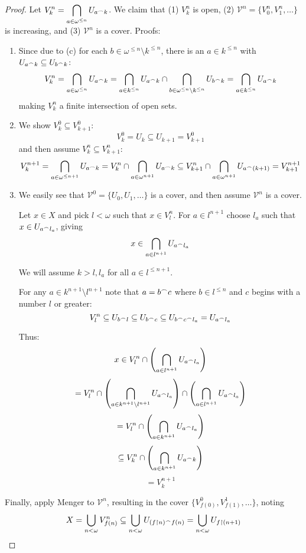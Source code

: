 \begin{proof}
    Let $\displaystyle V_k^n = \bigcap_{a\in\omega^{\leq n}} U_{a^\frown k}$. We claim that (1) $V_k^n$ is open, (2) $\mathcal{V}^n=\{V_0^n,V_1^n,\dots\}$ is increasing, and (3) $\mathcal{V}^n$ is a cover. Proofs:

    \begin{enumerate}
      \item
      Since due to (c) for each $b\in \omega^{\leq n} \setminus k^{\leq n}$, there is an $a\in k^{\leq n}$ with $U_{a^\frown k} \subseteq U_{b^\frown k}$: \[\displaystyle V_k^n = \bigcap_{a\in\omega^{\leq n}} U_{a^\frown k} = \bigcap_{a\in k^{\leq n}} U_{a^\frown k} \cap \bigcap_{b\in \omega^{\leq n} \setminus k^{\leq n}} U_{b^\frown k} = \bigcap_{a\in k^{\leq n}} U_{a^\frown k}\] making $V_k^n$ a finite intersection of open sets.

      \item
      We show $V_k^0\subseteq V_{k+1}^0$:
      \[
        V_k^0 = U_k \subseteq U_{k+1} = V_{k+1}^0
      \]
      and then assume $V_k^{n}\subseteq V_{k+1}^{n}$:
      \[
        V_k^{n+1} = 
        \bigcap_{a\in{\omega}^{\leq n+1}} U_{a^\frown k} = 
        V_k^{n} \cap \bigcap_{a\in{\omega}^{n+1}} U_{a^\frown k} \subseteq
        V_{k+1}^{n} \cap \bigcap_{a\in{\omega}^{n+1}} U_{a^\frown (k+1)} =
        V_{k+1}^{n+1}
      \]

      \item
      We easily see that $\mathcal{V}^0=\{U_0,U_1,\dots\}$ is a cover, and then assume $\mathcal{V}^n$ is a cover.

      Let $x\in X$ and pick $l<\omega$ such that $x \in V^n_l$. For $a \in l^{n+1}$ choose $l_a$ such that $x\in U_{a^\frown l_a}$, giving
      \[ x \in \bigcap_{a\in l^{n+1}} U_{a^\frown l_a} \]
      
      We will assume $k>l,l_a$ for all $a\in l^{\leq n+1}$. 

      For any $a\in k^{n+1}\setminus l^{n+1}$ note that $a = b^\frown c$ where $b\in l^{\leq n}$ and $c$ begins with a number $l$ or greater:
      \[
        V^n_l \subseteq 
        U_{b^\frown l} \subseteq 
        U_{b^\frown c} \subseteq
        U_{b^\frown c^\frown l_a} = 
        U_{a^\frown l_a}
      \]

      Thus:
      \[ 
        x \in 
        V^n_l \cap \left(\bigcap_{a\in l^{n+1}} U_{a^\frown l_a}\right) 
      \]
      \[
        =
        V^n_l \cap \left(\bigcap_{a\in k^{n+1}\setminus l^{n+1}} U_{a^\frown l_a}\right) \cap \left(\bigcap_{a\in l^{n+1}} U_{a^\frown l_a}\right)
      \]
      \[
        =
        V^n_l \cap \left(\bigcap_{a\in k^{n+1}} U_{a^\frown l_a}\right)
      \]
      \[
        \subseteq
        V^n_k \cap \left(\bigcap_{a\in k^{n+1}} U_{a^\frown k}\right)
      \]
      \[
        =
        V^{n+1}_k
      \]
    \end{enumerate}

    Finally, apply Menger to $\mathcal{V}^n$, resulting in the cover $\{V_{f(0)}^0, V_{f(1)}^1, \dots\}$, noting \[X = \bigcup_{n<\omega}V_{f(n)}^n \subseteq \bigcup_{n<\omega} U_{(f\restriction n)^\frown f(n)} = \bigcup_{n<\omega} U_{f\restriction (n+1)}\]
  \end{proof}

